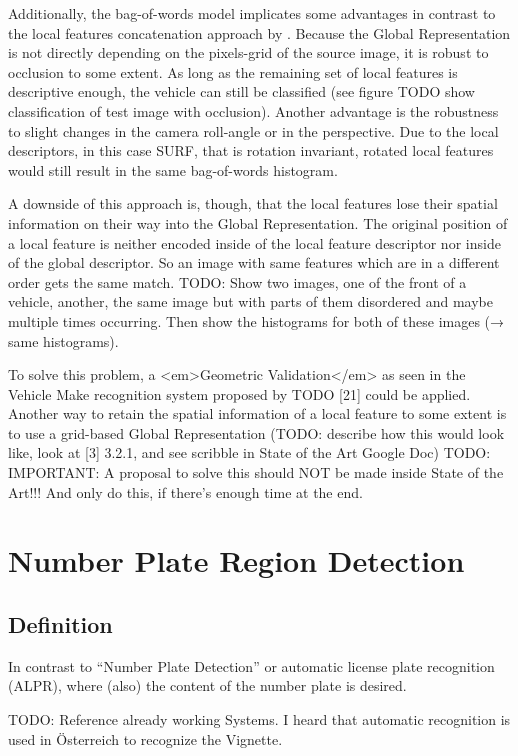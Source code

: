Additionally, the bag-of-words model implicates some advantages in contrast to the local features concatenation approach by \citeauthor{petrovic2004analysis}. Because the Global Representation is not directly depending on the pixels-grid of the source image, it is robust to occlusion to some extent. As long as the remaining set of local features is descriptive enough, the vehicle can still be classified (see figure TODO show classification of test image with occlusion). Another advantage is the robustness to slight changes in the camera roll-angle or in the perspective. Due to the local descriptors, in this case SURF, that is rotation invariant, rotated local features would still result in the same bag-of-words histogram.

A downside of this approach is, though, that the local features lose their spatial information on their way into the Global Representation. The original position of a local feature is neither encoded inside of the local feature descriptor nor inside of the global descriptor. So an image with same features which are in a different order gets the same match. TODO: Show two images, one of the front of a vehicle, another, the same image but with parts of them disordered and maybe multiple times occurring. Then show the histograms for both of these images (→ same histograms).

To solve this problem, a <em>Geometric Validation</em> as seen in the Vehicle Make recognition system proposed by TODO [21] could be applied. Another way to retain the spatial information of a local feature to some extent is to use a grid-based Global Representation (TODO: describe how this would look like, look at [3] 3.2.1, and see scribble in State of the Art Google Doc)
TODO: IMPORTANT: A proposal to solve this should NOT be made inside State of the Art!!! And only do this, if there's enough time at the end.


\section{Number Plate Region Detection}

\subsection{Definition}
In contrast to “Number Plate Detection” or automatic license plate recognition (ALPR), where (also) the content of the number plate is desired.

TODO: Reference already working Systems. I heard that automatic recognition is used in Österreich to recognize the Vignette.

